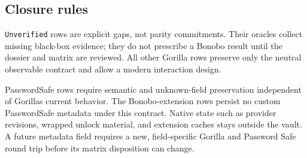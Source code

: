 \documentclass[
  letterpaper,
]{article}
\begin{document}
\subsection{Closure rules}\label{closure-rules}

\nolinkurl{Unverified} rows are explicit gaps, not parity commitments. Their oracles collect missing black-box evidence;
they do not prescribe a Bonobo result until the dossier and matrix are reviewed. All other Gorilla rows preserve only
the neutral observable contract and allow a modern interaction design.

PasswordSafe rows require semantic and unknown-field preservation independent of Gorilla\textquotesingle s current
behavior. The Bonobo-extension rows persist no custom PasswordSafe metadata under this contract. Native state such as
provider revisions, wrapped unlock material, and extension caches stays outside the vault. A future metadata field
requires a new, field-specific Gorilla and Password Safe round trip before its matrix disposition can change.
\end{document}
